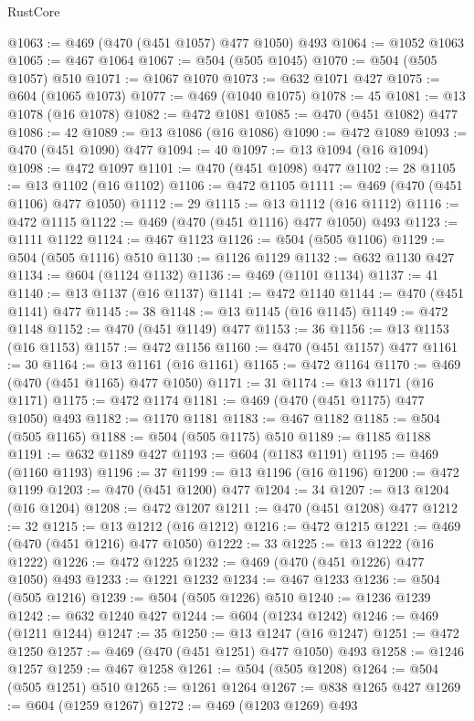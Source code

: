 \begin{lexlean}{RustCore}
\begin{coremodule}
@1063 := @469 (@470 (@451 @1057) @477 @1050) @493
@1064 := @1052 @1063
@1065 := @467 @1064
@1067 := @504 (@505 @1045)
@1070 := @504 (@505 @1057) @510
@1071 := @1067 @1070
@1073 := @632 @1071 @427
@1075 := @604 (@1065 @1073)
@1077 := @469 (@1040 @1075)
@1078 := 45
@1081 := @13 @1078 (@16 @1078)
@1082 := @472 @1081
@1085 := @470 (@451 @1082) @477
@1086 := 42
@1089 := @13 @1086 (@16 @1086)
@1090 := @472 @1089
@1093 := @470 (@451 @1090) @477
@1094 := 40
@1097 := @13 @1094 (@16 @1094)
@1098 := @472 @1097
@1101 := @470 (@451 @1098) @477
@1102 := 28
@1105 := @13 @1102 (@16 @1102)
@1106 := @472 @1105
@1111 := @469 (@470 (@451 @1106) @477 @1050)
@1112 := 29
@1115 := @13 @1112 (@16 @1112)
@1116 := @472 @1115
@1122 := @469 (@470 (@451 @1116) @477 @1050) @493
@1123 := @1111 @1122
@1124 := @467 @1123
@1126 := @504 (@505 @1106)
@1129 := @504 (@505 @1116) @510
@1130 := @1126 @1129
@1132 := @632 @1130 @427
@1134 := @604 (@1124 @1132)
@1136 := @469 (@1101 @1134)
@1137 := 41
@1140 := @13 @1137 (@16 @1137)
@1141 := @472 @1140
@1144 := @470 (@451 @1141) @477
@1145 := 38
@1148 := @13 @1145 (@16 @1145)
@1149 := @472 @1148
@1152 := @470 (@451 @1149) @477
@1153 := 36
@1156 := @13 @1153 (@16 @1153)
@1157 := @472 @1156
@1160 := @470 (@451 @1157) @477
@1161 := 30
@1164 := @13 @1161 (@16 @1161)
@1165 := @472 @1164
@1170 := @469 (@470 (@451 @1165) @477 @1050)
@1171 := 31
@1174 := @13 @1171 (@16 @1171)
@1175 := @472 @1174
@1181 := @469 (@470 (@451 @1175) @477 @1050) @493
@1182 := @1170 @1181
@1183 := @467 @1182
@1185 := @504 (@505 @1165)
@1188 := @504 (@505 @1175) @510
@1189 := @1185 @1188
@1191 := @632 @1189 @427
@1193 := @604 (@1183 @1191)
@1195 := @469 (@1160 @1193)
@1196 := 37
@1199 := @13 @1196 (@16 @1196)
@1200 := @472 @1199
@1203 := @470 (@451 @1200) @477
@1204 := 34
@1207 := @13 @1204 (@16 @1204)
@1208 := @472 @1207
@1211 := @470 (@451 @1208) @477
@1212 := 32
@1215 := @13 @1212 (@16 @1212)
@1216 := @472 @1215
@1221 := @469 (@470 (@451 @1216) @477 @1050)
@1222 := 33
@1225 := @13 @1222 (@16 @1222)
@1226 := @472 @1225
@1232 := @469 (@470 (@451 @1226) @477 @1050) @493
@1233 := @1221 @1232
@1234 := @467 @1233
@1236 := @504 (@505 @1216)
@1239 := @504 (@505 @1226) @510
@1240 := @1236 @1239
@1242 := @632 @1240 @427
@1244 := @604 (@1234 @1242)
@1246 := @469 (@1211 @1244)
@1247 := 35
@1250 := @13 @1247 (@16 @1247)
@1251 := @472 @1250
@1257 := @469 (@470 (@451 @1251) @477 @1050) @493
@1258 := @1246 @1257
@1259 := @467 @1258
@1261 := @504 (@505 @1208)
@1264 := @504 (@505 @1251) @510
@1265 := @1261 @1264
@1267 := @838 @1265 @427
@1269 := @604 (@1259 @1267)
@1272 := @469 (@1203 @1269) @493

\end{coremodule}
\end{lexlean}

